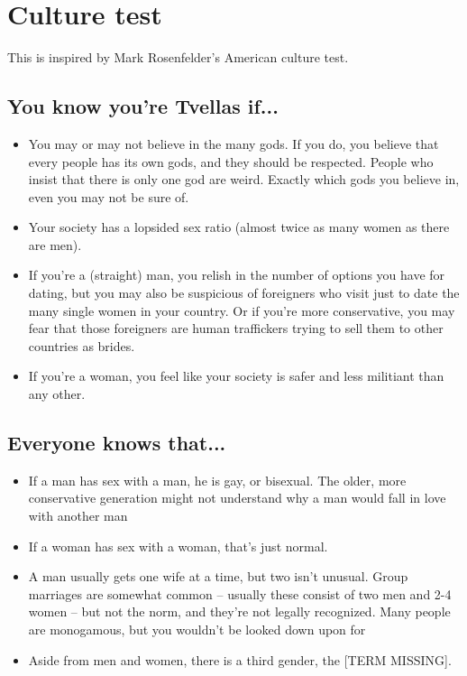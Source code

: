 \chapter{Culture test}

This is inspired by Mark Rosenfelder's American culture test.

\section*{You know you're Tvellas if...}

\begin{itemize}
    \item You may or may not believe in the many gods. If you do, you believe that every people has
        its own gods, and they should be respected. People who insist that there is only one god are
        weird. Exactly which gods you believe in, even you may not be sure of.
    \item Your society has a lopsided sex ratio (almost twice as many women as there are men).
    \item If you're a (straight) man, you relish in the number of options you have for dating, but
        you may also be suspicious of foreigners who visit just to date the many single women in
        your country. Or if you're more conservative, you may fear that those foreigners are human
        traffickers trying to sell them to other countries as brides.
    \item If you're a woman, you feel like your society is safer and less militiant than any other.
\end{itemize}

\section*{Everyone knows that...}

\begin{itemize}
    \item If a man has sex with a man, he is gay, or bisexual. The older, more conservative
        generation might not understand why a man would fall in love with another man
    \item If a woman has sex with a woman, that's just normal.
    \item A man usually gets one wife at a time, but two isn't unusual. Group marriages are somewhat
        common -- usually these consist of two men and 2-4 women -- but not the norm, and they're
        not legally recognized. Many people are monogamous, but you wouldn't be looked down upon for
    \item Aside from men and women, there is a third gender, the [TERM MISSING].
\end{itemize}

\section*{}
